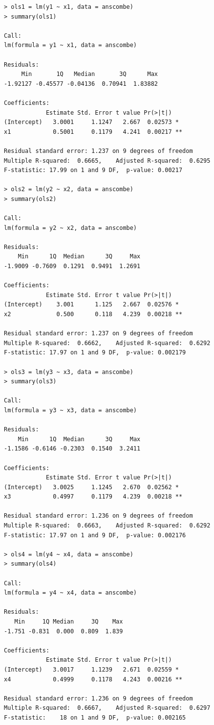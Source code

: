 \begin{lstlisting}
> ols1 = lm(y1 ~ x1, data = anscombe)
> summary(ols1)

Call:
lm(formula = y1 ~ x1, data = anscombe)

Residuals:
     Min       1Q   Median       3Q      Max 
-1.92127 -0.45577 -0.04136  0.70941  1.83882 

Coefficients:
            Estimate Std. Error t value Pr(>|t|)   
(Intercept)   3.0001     1.1247   2.667  0.02573 * 
x1            0.5001     0.1179   4.241  0.00217 **

Residual standard error: 1.237 on 9 degrees of freedom
Multiple R-squared:  0.6665,	Adjusted R-squared:  0.6295 
F-statistic: 17.99 on 1 and 9 DF,  p-value: 0.00217

> ols2 = lm(y2 ~ x2, data = anscombe)
> summary(ols2)

Call:
lm(formula = y2 ~ x2, data = anscombe)

Residuals:
    Min      1Q  Median      3Q     Max 
-1.9009 -0.7609  0.1291  0.9491  1.2691 

Coefficients:
            Estimate Std. Error t value Pr(>|t|)   
(Intercept)    3.001      1.125   2.667  0.02576 * 
x2             0.500      0.118   4.239  0.00218 **

Residual standard error: 1.237 on 9 degrees of freedom
Multiple R-squared:  0.6662,	Adjusted R-squared:  0.6292 
F-statistic: 17.97 on 1 and 9 DF,  p-value: 0.002179

> ols3 = lm(y3 ~ x3, data = anscombe)
> summary(ols3)

Call:
lm(formula = y3 ~ x3, data = anscombe)

Residuals:
    Min      1Q  Median      3Q     Max 
-1.1586 -0.6146 -0.2303  0.1540  3.2411 

Coefficients:
            Estimate Std. Error t value Pr(>|t|)   
(Intercept)   3.0025     1.1245   2.670  0.02562 * 
x3            0.4997     0.1179   4.239  0.00218 **

Residual standard error: 1.236 on 9 degrees of freedom
Multiple R-squared:  0.6663,	Adjusted R-squared:  0.6292 
F-statistic: 17.97 on 1 and 9 DF,  p-value: 0.002176

> ols4 = lm(y4 ~ x4, data = anscombe)
> summary(ols4)

Call:
lm(formula = y4 ~ x4, data = anscombe)

Residuals:
   Min     1Q Median     3Q    Max 
-1.751 -0.831  0.000  0.809  1.839 

Coefficients:
            Estimate Std. Error t value Pr(>|t|)   
(Intercept)   3.0017     1.1239   2.671  0.02559 * 
x4            0.4999     0.1178   4.243  0.00216 **

Residual standard error: 1.236 on 9 degrees of freedom
Multiple R-squared:  0.6667,	Adjusted R-squared:  0.6297 
F-statistic:    18 on 1 and 9 DF,  p-value: 0.002165
\end{lstlisting}


